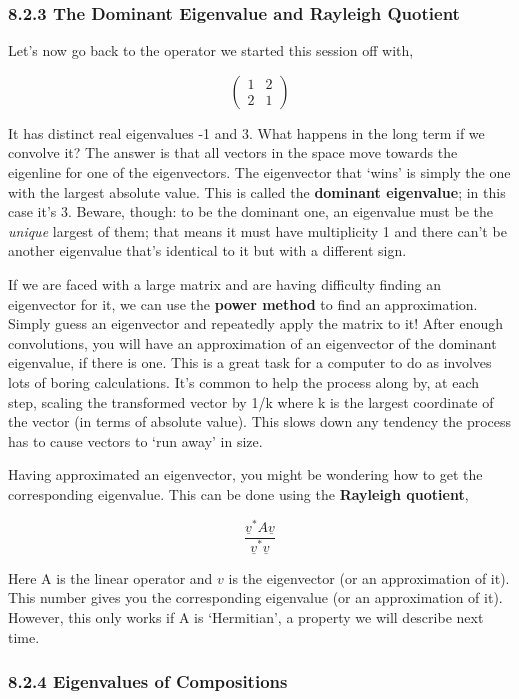 \documentclass[oneside,english]{amsbook}
\numberwithin{section}{chapter}
\theoremstyle{plain}
\theoremstyle{definition}
\begin{document}
\subsubsection{8.2.3 The Dominant Eigenvalue and Rayleigh
	Quotient}\label{the-dominant-eigenvalue-and-rayleigh-quotient}

Let's now go back to the operator we started this session off with,

\[\begin{pmatrix}
	1 & 2 \\
	2 & 1
\end{pmatrix}\]

It has distinct real eigenvalues -1 and 3. What happens in the long term
if we convolve it? The answer is that all vectors in the space move
towards the eigenline for one of the eigenvectors. The eigenvector that
`wins' is simply the one with the largest absolute value. This is
called the \textbf{dominant eigenvalue}; in this case it's 3. Beware,
though: to be the dominant one, an eigenvalue must be the \emph{unique}
largest of them; that means it must have multiplicity 1 and there can't
be another eigenvalue that's identical to it but with a different sign.

If we are faced with a large matrix and are having difficulty finding an
eigenvector for it, we can use the \textbf{power method} to find an
approximation. Simply guess an eigenvector and repeatedly apply the
matrix to it! After enough convolutions, you will have an approximation
of an eigenvector of the dominant eigenvalue, if there is one. This is a
great task for a computer to do as involves lots of boring calculations.
It's common to help the process along by, at each step, scaling the
transformed vector by 1/k where k is the largest coordinate of the
vector (in terms of absolute value). This slows down any tendency the
process has to cause vectors to `run away' in size.

Having approximated an eigenvector, you might be wondering how to get
the corresponding eigenvalue. This can be done using the
\textbf{Rayleigh quotient},

\[\frac{{\underline{v}}^{*}A\underline{v}}{{\underline{v}}^{*}\underline{v}}\]

Here A is the linear operator and $v$ is the eigenvector (or an
approximation of it). This number gives you the corresponding eigenvalue
(or an approximation of it). However, this only works if A is
`Hermitian', a property we will describe next time.

\subsubsection{8.2.4 Eigenvalues of
	Compositions}\label{eigenvalues-of-compositions}
\end{document}
